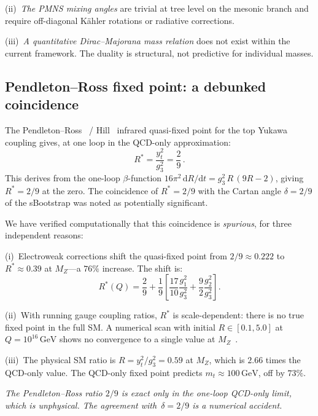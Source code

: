 \documentclass[aps,prd,twocolumn,showpacs,preprintnumbers,superscriptaddress,floatfix]{revtex4-2}
\newcommand{\GeV}{\,\mathrm{GeV}}
\newcommand{\dd}{\mathrm{d}}
\begin{document}
(ii)~\emph{The PMNS mixing angles} are trivial at tree level on
the mesonic branch and require off-diagonal K\"ahler rotations or
radiative corrections.

(iii)~\emph{A quantitative Dirac--Majorana mass relation} does not
exist within the current framework.
The duality is structural, not predictive for individual masses.

\subsection{Pendleton--Ross fixed point: a debunked coincidence}
\label{sec:pendleton_ross}

The Pendleton--Ross~\cite{PendletonRoss:1981} / Hill~\cite{Hill:1981}
infrared quasi-fixed point for the top Yukawa coupling gives,
at one loop in the QCD-only approximation:
\begin{equation}
  R^* = \frac{y_t^2}{g_3^2} = \frac{2}{9}\,.
  \label{eq:PR}
\end{equation}
This derives from the one-loop $\beta$-function
$16\pi^2\,\dd R/\dd t = g_3^2\,R\,(9R - 2)$,
giving $R^* = 2/9$ at the zero.
The coincidence of $R^* = 2/9$ with the Cartan angle
$\delta = 2/9$ of the sBootstrap was noted as potentially
significant.

We have verified computationally that this coincidence is
\emph{spurious}, for three independent reasons:

(i)~Electroweak corrections shift the quasi-fixed point from
$2/9 \approx 0.222$ to $R^* \approx 0.39$ at $M_Z$---a $76\%$
increase.
The shift is:
\begin{equation}
  R^*(Q)
    = \frac{2}{9}
    + \frac{1}{9}\!\left[
      \frac{17}{10}\frac{g_1^2}{g_3^2}
    + \frac{9}{2}\frac{g_2^2}{g_3^2}
    \right]\!.
  \label{eq:PR_EW}
\end{equation}

(ii)~With running gauge coupling ratios, $R^*$ is
scale-dependent: there is no true fixed point in the full SM.
A numerical scan with initial $R \in [0.1, 5.0]$ at
$Q = 10^{16}\GeV$ shows no convergence to a single value at
$M_Z$~\cite{Zimmermann:1985}.

(iii)~The physical SM ratio is $R = y_t^2/g_3^2 = 0.59$ at
$M_Z$, which is $2.66$ times the QCD-only value.
The QCD-only fixed point predicts
$m_t \approx 100\GeV$, off by $73\%$.

\emph{The Pendleton--Ross ratio $2/9$ is exact only in the
one-loop QCD-only limit, which is unphysical.
The agreement with~$\delta = 2/9$ is a numerical accident.}
\end{document}
